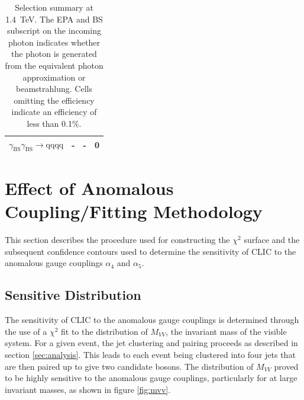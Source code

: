 \begin{table}[h!]
\begin{tabular}{ l r r r }
$\gamma_{\text{BS}}\gamma_{\text{BS}} \rightarrow \text{qqqq}$ & - & - & 0 \\
\hline
\end{tabular}
\caption[Selection summary at 1.4~TeV.   The EPA and BS subscript on the incoming photon indicates whether the photon is generated from the equivalent photon approximation or beamstrahlung.  Cells omitting the efficiency indicate an efficiency of less than 0.1\%.]{Selection summary at 1.4~TeV.   The EPA and BS subscript on the incoming photon indicates whether the photon is generated from the equivalent photon approximation or beamstrahlung.  Cells omitting the efficiency indicate an efficiency of less than 0.1\%.}
\label{table:selectionsummary1400GeV}
\end{table}


\section{Effect of Anomalous Coupling/Fitting Methodology}
\label{sec:fitting}
This section describes the procedure used for constructing the $\chi^{2}$ surface and the subsequent confidence contours used to determine the sensitivity of CLIC to the anomalous gauge couplings $\alpha_{4}$ and $\alpha_{5}$.


\subsection{Sensitive Distribution}
The sensitivity of CLIC to the anomalous gauge couplings is determined through the use of a $\chi^{2}$ fit to the distribution of $M_{VV}$, the invariant mass of the visible system.  For a given event, the jet clustering and pairing proceeds as described in section \ref{sec:analysis}.  This leads to each event being clustered into four jets that are then paired up to give two candidate bosons.  The distribution of $M_{VV}$ proved to be highly sensitive to the anomalous gauge couplings, particularly for at large invariant masses, as shown in figure \ref{fig:mvv}.

